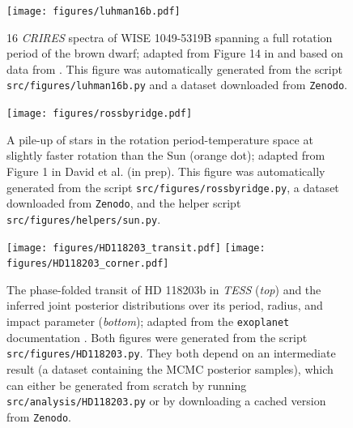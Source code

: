 \documentclass[twocolumn]{aastex631}
\begin{document}
\begin{figure}[ht!]
    \begin{centering}
        \texttt{[image: figures/luhman16b.pdf]}
        \caption{
            16 \emph{CRIRES} spectra of WISE 1049-5319B spanning a full rotation period of the brown dwarf; adapted from Figure 14 in \citet{Luger2021} and based on data from \citet{Crossfield2014}.
            This figure was automatically generated from the script \texttt{src/figures/luhman16b.py} and a dataset downloaded from \texttt{Zenodo}.
        }
        \label{fig:luhman16b}
    \end{centering}
\end{figure}

\begin{figure}[ht!]
    \begin{centering}
        \texttt{[image: figures/rossbyridge.pdf]}
        \caption{
            A pile-up of stars in the rotation period-temperature space at slightly faster rotation than the Sun (orange dot); adapted from Figure 1 in David et al. (in prep).
            This figure was automatically generated from the script \texttt{src/figures/rossbyridge.py}, a dataset downloaded from \texttt{Zenodo}, and the helper script \texttt{src/figures/helpers/sun.py}.
        }
        \label{fig:rossbyridge}
    \end{centering}
\end{figure}

\begin{figure}[ht!]
    \begin{centering}
        \texttt{[image: figures/HD118203\_transit.pdf]}
        \texttt{[image: figures/HD118203\_corner.pdf]}
        \caption{
            The phase-folded transit of HD 118203b in \emph{TESS} (\emph{top}) and the inferred joint posterior distributions over its period, radius, and impact parameter (\emph{bottom}); adapted from the \texttt{exoplanet} documentation \citep{ForemanMackey2021}.
            Both figures were generated from the script \texttt{src/figures/HD118203.py}. 
            They both depend on an intermediate result (a dataset containing the MCMC posterior samples), which can either be generated from scratch by running \texttt{src/analysis/HD118203.py} or by downloading a cached version from \texttt{Zenodo}.
        }
        \label{fig:HD118203}
    \end{centering}
\end{figure}
\end{document}
